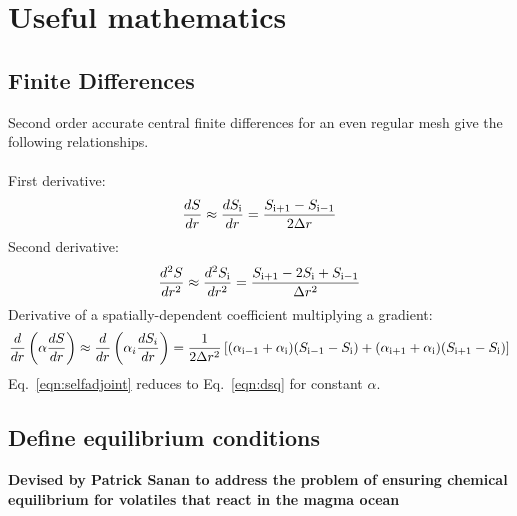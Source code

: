 \section{Useful mathematics}
\subsection{Finite Differences}
Second order accurate central finite differences for an even regular mesh give the following relationships.\\ \\ First derivative:
\begin{equation}
\frac{dS}{dr} \approx \frac{dS_{\rm{i}}}{dr} = \frac{S_{\rm{i+1}}-S_{\rm{i-1}}}{2 \Delta r}
\end{equation}
Second derivative:
\begin{equation}
\label{eqn:dsq}
\frac{d^2S}{dr^2} \approx \frac{d^2S_{\rm{i}}}{dr^2} = \frac{S_{\rm{i+1}}-2S_{\rm{i}}+S_{\rm{i-1}}}{\Delta r^2}
\end{equation}
Derivative of a spatially-dependent coefficient multiplying a gradient:
\begin{equation}
\label{eqn:selfadjoint}
\frac{d}{dr} \left( \alpha \frac{dS}{dr}\right) \approx \frac{d}{dr} \left( \alpha_i \frac{dS_i}{dr} \right) = \frac{1}{2 \Delta r^2} \left[ (\alpha_{\rm{i-1}}+\alpha_{\rm{i}})(S_{\rm{i-1}}-S_{\rm{i}}) + (\alpha_{\rm{i+1}}+\alpha_{\rm{i}})(S_{\rm{i+1}}-S_{\rm{i}})  \right]
\end{equation}
Eq.~\ref{eqn:selfadjoint} reduces to Eq.~\ref{eqn:dsq} for constant $\alpha$.
\subsection{Define equilibrium conditions}
\textbf{Devised by Patrick Sanan to address the problem of ensuring chemical equilibrium for volatiles that react in the magma ocean}

